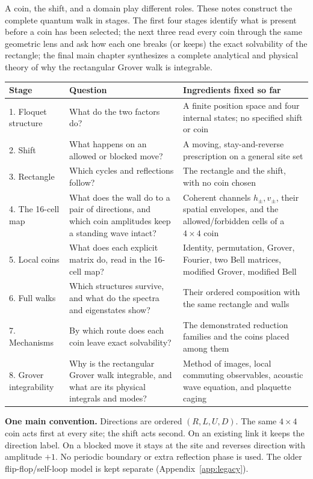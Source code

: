 \documentclass[11pt,a4paper,oneside]{report}
\numberwithin{equation}{chapter}
\begin{document}
A coin, the shift, and a domain play different roles. These notes
construct the complete quantum walk in stages. The first four stages
identify what is present before a coin has been selected; the next three
read every coin through the same geometric lens and ask how each
one breaks (or keeps) the exact solvability of the rectangle; the final
main chapter synthesizes a complete analytical and physical theory of why
the rectangular Grover walk is integrable.
\begin{center}\small
\begin{tabularx}{\textwidth}{@{}lYY@{}}\toprule
Stage & Question & Ingredients fixed so far\\. Floquet structure & What do the two factors do?
& A finite position space and four internal states; no specified shift or coin\\
2. Shift & What happens on an allowed or blocked move?
& A moving, stay-and-reverse prescription on a general site set\\
3. Rectangle & Which cycles and reflections follow?
& The rectangle and the shift, with no coin chosen\\
4. The 16-cell map & What does the wall do to a pair of directions, and which coin amplitudes keep a standing wave intact?
& Coherent channels \(h_\pm,v_\pm\), their spatial envelopes, and the allowed/forbidden cells of a \(4\times4\) coin\\
5. Local coins & What does each explicit matrix do, read in the 16-cell map?
& Identity, permutation, Grover, Fourier, two Bell matrices, modified Grover, modified Bell\\
6. Full walks & Which structures survive, and what do the spectra and eigenstates show?
& Their ordered composition with the same rectangle and walls\\
7. Mechanisms & By which route does each coin leave exact solvability?
& The demonstrated reduction families and the coins placed among them\\
8. Grover integrability & Why is the rectangular Grover walk integrable, and what are its physical integrals and modes?
& Method of images, local commuting observables, acoustic wave equation, and plaquette caging\\\bottomrule
\end{tabularx}
\end{center}

\textbf{One main convention.} Directions are ordered \((R,L,U,D)\).
The same \(4\times4\) coin acts first at every site; the shift acts
second. On an existing link it keeps the direction label. On a blocked
move it stays at the site and reverses direction with amplitude \(+1\).
No periodic boundary or extra reflection phase is used. The older
flip-flop/self-loop model is kept separate (Appendix~\ref{app:legacy}).
\end{document}
